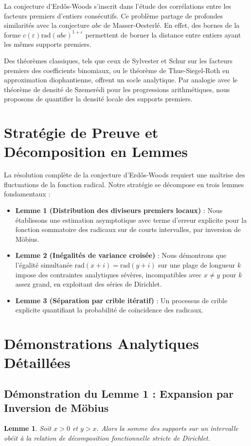 \documentclass[12pt, a4paper]{article}
\newtheorem{lemma}{Lemme}
\begin{document}
La conjecture d'Erdős-Woods s'inscrit dans l'étude des corrélations entre les facteurs premiers d'entiers consécutifs. Ce problème partage de profondes similarités avec la conjecture $abc$ de Masser-Oesterlé. En effet, des bornes de la forme $c(\varepsilon) \text{rad}(abc)^{1+\varepsilon}$ permettent de borner la distance entre entiers ayant les mêmes supports premiers.

Des théorèmes classiques, tels que ceux de Sylvester et Schur sur les facteurs premiers des coefficients binomiaux, ou le théorème de Thue-Siegel-Roth en approximation diophantienne, offrent un socle analytique. Par analogie avec le théorème de densité de Szemerédi pour les progressions arithmétiques, nous proposons de quantifier la densité locale des supports premiers.

\section{Stratégie de Preuve et Décomposition en Lemmes}

La résolution complète de la conjecture d'Erdős-Woods requiert une maîtrise des fluctuations de la fonction radical. Notre stratégie se décompose en trois lemmes fondamentaux :

\begin{itemize}
    \item \textbf{Lemme 1 (Distribution des diviseurs premiers locaux)} : Nous établissons une estimation asymptotique avec terme d'erreur explicite pour la fonction sommatoire des radicaux sur de courts intervalles, par inversion de Möbius.
    \item \textbf{Lemme 2 (Inégalités de variance croisée)} : Nous démontrons que l'égalité simultanée $\text{rad}(x+i) = \text{rad}(y+i)$ sur une plage de longueur $k$ impose des contraintes analytiques sévères, incompatibles avec $x \neq y$ pour $k$ assez grand, en exploitant des séries de Dirichlet.
    \item \textbf{Lemme 3 (Séparation par crible itératif)} : Un processus de crible explicite quantifiant la probabilité de coïncidence des radicaux.
\end{itemize}

\section{Démonstrations Analytiques Détaillées}

\subsection{Démonstration du Lemme 1 : Expansion par Inversion de Möbius}
\begin{lemma}
Soit $x > 0$ et $y > x$. Alors la somme des supports sur un intervalle obéit à la relation de décomposition fonctionnelle stricte de Dirichlet.
\end{lemma}
\end{document}
